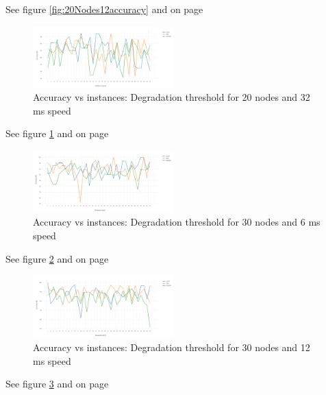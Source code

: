 \documentclass[letterpaper, 10 pt, conference]{ieeeconf}  %
\begin{document}
See figure \ref{fig:20Nodes12accuracy} and on page \pageref{fig:20Nodes12accuracy}



\begin{figure}[H]
\includegraphics[width=0.48\textwidth]{20Nodes32accuracy}
\caption{Accuracy vs instances: Degradation threshold for 20 nodes and 32 ms speed}
\label{fig:20Nodes32accuracy}
\end{figure}

See figure \ref{fig:20Nodes32accuracy} and on page \pageref{fig:20Nodes32accuracy}




\begin{figure}[H]
\includegraphics[width=0.48\textwidth]{30Nodes06accuracy}
\caption{Accuracy vs instances: Degradation threshold for 30 nodes and 6 ms speed}
\label{fig:30Nodes06accuracy}
\end{figure}

See figure \ref{fig:30Nodes06accuracy} and on page \pageref{fig:30Nodes06accuracy}





\begin{figure}[H]
\includegraphics[width=0.48\textwidth]{30Nodes12accuracy}
\caption{Accuracy vs instances: Degradation threshold for 30 nodes and 12 ms speed}
\label{fig:30Nodes12accuracy}
\end{figure}

See figure \ref{fig:30Nodes12accuracy} and on page \pageref{fig:30Nodes12accuracy}
\end{document}
